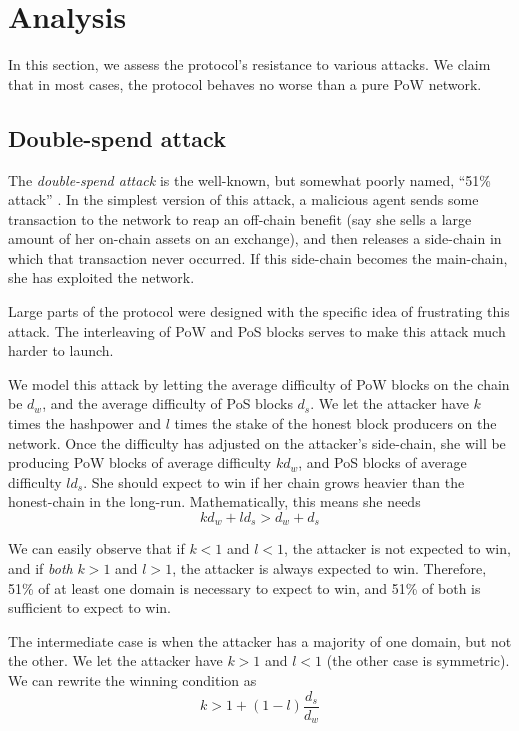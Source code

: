 \section{Analysis}
\label{analysis}

In this section, we assess the protocol's resistance to various attacks. We claim that
in most cases, the protocol behaves no worse than a pure PoW network. 

\subsection{Double-spend attack}
\label{double_spend_attack}

The \textit{double-spend attack}
is the well-known, but somewhat poorly named, ``51\% attack'' \cite{selfish_mining}. In the simplest version of this attack, a malicious agent
sends some transaction to the network to reap an off-chain benefit (say she sells a large
amount of her on-chain assets on an exchange), and then releases a side-chain in which
that transaction never occurred. If this side-chain becomes the main-chain, she has 
exploited the network.

Large parts of the protocol were designed with the specific idea of frustrating
this attack. The interleaving of PoW and PoS blocks serves to make this attack much harder to launch.

We model this attack by letting the average difficulty of PoW blocks on the chain
be $d_w$, and the average difficulty of PoS blocks $d_s$.
We let the attacker have $k$ times the hashpower and $l$ times
the stake of the honest block producers on the network. Once the difficulty has adjusted on the
attacker's side-chain, she will be producing PoW blocks of average difficulty $kd_w$, and PoS
blocks of average difficulty $ld_s$. She should expect to win if her chain grows heavier 
than the honest-chain in the long-run. Mathematically, this means she needs
$$kd_w + ld_s > d_w + d_s$$

We can easily observe that if $k < 1$ and $l < 1$, the attacker is not expected to win, and
if \textit {both} $k>1$ and $l>1$, the attacker is always expected to win.
Therefore, 51\% of at least one
domain is necessary to expect to win,
and 51\% of both is sufficient to expect to win. 

The intermediate case is when the attacker has a majority of one domain,
but not the other. We let the attacker have $k>1$ and $l<1$ (the other case
is symmetric). We can rewrite the winning condition as 
$$k > 1 + (1-l)\frac{d_s}{d_w}$$

